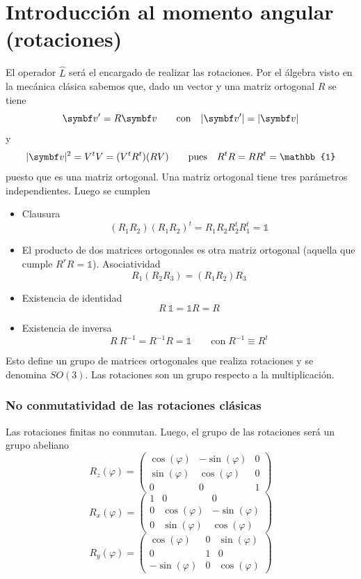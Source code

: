 \documentclass[10pt,oneside]{CBFT_book}
\begin{document}
\chapter{Introducción al momento angular (rotaciones)}

El operador $\hat{L}$ será el encargado de realizar las rotaciones. Por el álgebra visto en la mecánica 
clásica sabemos que, dado un vector  y una matriz ortogonal $R$ se tiene
\[
	\vb{v}' = R \vb{v} \qquad \text{con} \quad |\vb{v}'|=|\vb{v}|
\]
y 
\[
	|\vb{v}|^2 = V^t V = (V^t R^t) (R V) \qquad \text{pues} \quad R^tR=RR^t = \mathbb{1}
\]
puesto que es una matriz ortogonal.
Una matriz ortogonal tiene tres parámetros independientes.
Luego se cumplen 
\begin{itemize}
 \item Clausura 
 \[
	(R_1R_2)(R_1R_2)^t = R_1R_2R_2^tR_1^t = \mathbb{1}
\]
\item El producto de dos matrices ortogonales es otra matriz ortogonal (aquella que cumple $R^rR=\mathbb{1}$).
Asociatividad
\[
	R_1(R_2R_3) = (R_1R_2)R_3
\]
\item Existencia de identidad
\[
	R \: \mathbb{1} = \mathbb{1}R = R
\]
\item Existencia de inversa
\[
	R \: R^{-1} = R^{-1}R = \mathbb{1} \qquad \text{con}\; R^{-1}\equiv R^t
\]
\end{itemize}

Esto define un grupo de matrices ortogonales que realiza rotaciones y se denomina $SO(3)$.
Las rotaciones son un grupo respecto a la multiplicación.

\subsection{No conmutatividad de las rotaciones clásicas}

Las rotaciones finitas no conmutan. Luego, el grupo de las rotaciones será un grupo abeliano
\[
	R_z(\varphi) = \begin{pmatrix}
	\cos(\varphi) & -\sin(\varphi) & 0 \\
	\sin(\varphi) & \cos(\varphi) & 0 \\
	0 & 0 & 1
	\end{pmatrix}
\]
\[
	R_x(\varphi) = \begin{pmatrix}
	1 & 0 & 0 \\
	0 & \cos(\varphi) & -\sin(\varphi) \\
	0 & \sin(\varphi) & \cos(\varphi)
	\end{pmatrix}
\]
\[
	R_y(\varphi) = \begin{pmatrix}
	\cos(\varphi) & 0 & \sin(\varphi) \\
	0 & 1 & 0 \\
	-\sin(\varphi) & 0 & \cos(\varphi)
	\end{pmatrix}
\]
\end{document}
